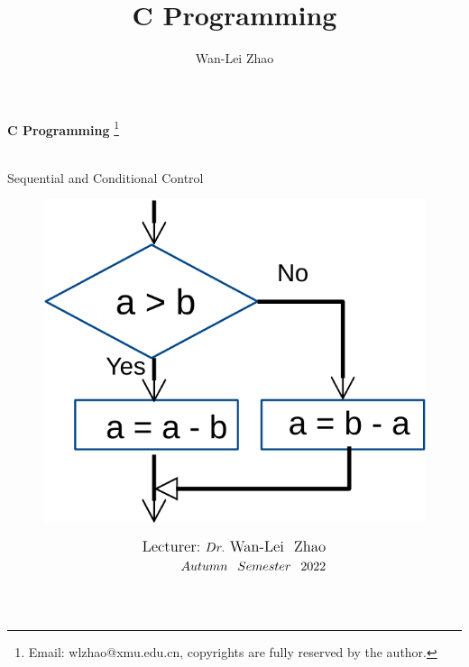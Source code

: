 \documentclass[]{beamer}
\title{C Programming}
\author{Wan-Lei Zhao}
\newcommand\blfootnote[1]{
  \begingroup
  \renewcommand\thefootnote{}\footnote{#1}
  \addtocounter{footnote}{-1}
  \endgroup
}
\begin{document}
\begin{frame}
   \begin{center}
    \vspace{24pt}
    \Huge\textbf{C Programming}\blfootnote{Email: wlzhao@xmu.edu.cn, copyrights are fully reserved by the author.}\\
     \Huge{Sequential and Conditional Control}
      \begin{figure}
     	\begin{center}
     		\includegraphics[width=0.3\linewidth]{figs/cover_lec3.pdf}
     	\end{center}
     \end{figure}
    \vspace{6pt}
  \end{center}
  \begin{align*}
   \vspace{18pt}
      \large{\mbox{Lecturer:}~Dr.~\mbox{Wan-Lei~~Zhao}} \\
      \large{Autumn~~Semester~~2022} \\
   \vspace{30pt}
  \end{align*}
\end{frame}






\section{}
\end{document}
